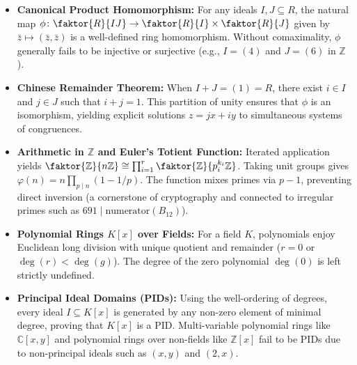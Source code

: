 \begin{overview}
\begin{itemize}
    \item \textbf{Canonical Product Homomorphism:} For any ideals $I, J \subseteq R$, the natural map $\phi \colon \faktor{R}{IJ} \to \faktor{R}{I} \times \faktor{R}{J}$ given by $\bar{z} \mapsto (\bar{z}, \bar{z})$ is a well-defined ring homomorphism. Without comaximality, $\phi$ generally fails to be injective or surjective (e.g., $I = (4)$ and $J = (6)$ in $\mathbb{Z}$).
    \item \textbf{Chinese Remainder Theorem:} When $I + J = (1) = R$, there exist $i \in I$ and $j \in J$ such that $i + j = 1$. This partition of unity ensures that $\phi$ is an isomorphism, yielding explicit solutions $z = jx + iy$ to simultaneous systems of congruences.
    \item \textbf{Arithmetic in $\mathbb{Z}$ and Euler's Totient Function:} Iterated application yields $\faktor{\mathbb{Z}}{n\mathbb{Z}} \cong \prod_{i=1}^r \faktor{\mathbb{Z}}{p_i^{k_i}\mathbb{Z}}$. Taking unit groups gives $\varphi(n) = n \prod_{p \mid n} (1 - 1/p)$. The function mixes primes via $p - 1$, preventing direct inversion (a cornerstone of cryptography and connected to irregular primes such as $691 \mid \text{numerator}(B_{12})$).
    \item \textbf{Polynomial Rings $K[x]$ over Fields:} For a field $K$, polynomials enjoy Euclidean long division with unique quotient and remainder ($r = 0$ or $\deg(r) < \deg(g)$). The degree of the zero polynomial $\deg(0)$ is left strictly undefined.
    \item \textbf{Principal Ideal Domains (PIDs):} Using the well-ordering of degrees, every ideal $I \subseteq K[x]$ is generated by any non-zero element of minimal degree, proving that $K[x]$ is a PID. Multi-variable polynomial rings like $\mathbb{C}[x, y]$ and polynomial rings over non-fields like $\mathbb{Z}[x]$ fail to be PIDs due to non-principal ideals such as $(x, y)$ and $(2, x)$.
\end{itemize}
\end{overview}